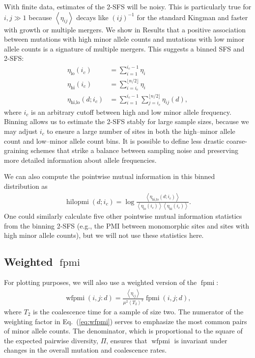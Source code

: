 \documentclass[11pt, letterpaper]{article}   	%
\newcommand{\eq}[1]{Eq.~(\ref{#1})}
\newcommand{\floor}[1]{\lfloor #1 \rfloor}
\newcommand{\E}[1]{\left< #1 \right>}
\DeclareMathOperator{\fpmi}{fpmi}
\DeclareMathOperator{\wfpmi}{wfpmi}
\DeclareMathOperator{\hilopmi}{hilopmi}
\begin{document}
With finite data, estimates of the 2-SFS will be noisy.
This is particularly true for $i,j\gg1$ because $\E{\eta_{ij}}$ decays like $(ij)^{-1}$ for the standard Kingman \autocite{Fu1995} and faster with growth or multiple mergers.
We show in Results that a positive association between mutations with high minor allele counts and mutations with low minor allele counts is a signature of multiple mergers.
This suggests a binned SFS and 2-SFS:
\begin{align}
    \eta_{\text{lo}}(i_c) &= \sum_{i=1}^{i_c-1} \eta_i \\
    \eta_{\text{hi}}(i_c) &= \sum_{i=i_c}^{\floor{n/2}} \eta_i \\
    \eta_{\text{hi,lo}}(d; i_c) &= \sum_{i=1}^{i_c-1} \sum_{j=i_c}^{\floor{n/2}} \eta_{ij}(d),
\end{align}
where $i_c$ is an arbitrary cutoff between high and low minor allele frequency.
Binning allows us to estimate the 2-SFS stably for large sample sizes, because we may adjust $i_c$ to ensure a large number of sites in both the high--minor allele count and low--minor allele count bins.
It is possible to define less drastic coarse-graining schemes that strike a balance between sampling noise and preserving more detailed information about allele frequencies.

We can also compute the pointwise mutual information in this binned distribution as
\begin{align}
    \hilopmi(d; i_c) = \log \frac
                                {\E{\eta_{\text{hi,lo}}(d; i_c)}}
                                {\E{\eta_{\text{lo}}(i_c)}  \E{\eta_{\text{hi}}(i_c)}}.
\end{align}
One could similarly calculate five other pointwise mutual information statistics from the binning 2-SFS (e.g., the PMI between monomorphic sites and sites with high minor allele counts), but we will not use these statistics here.


\subsection*{Weighted $\fpmi$}
For plotting purposes, we will also use a weighted version of the $\fpmi$:
\begin{align}
    \wfpmi(i,j:d) = \frac{\E{\eta_{ij}}}{\mu^2 \E{T_2}^2} \fpmi(i,j;d),
    \label{eq:wfpmi}
\end{align}
where $T_2$ is the coalescence time for a sample of size two.
The numerator of the weighting factor in \eq{eq:wfpmi} serves to emphasize the most common pairs of minor allele counts.
The denominator, which is proportional to the square of the expected pairwise diversity, $\Pi$, ensures that $\wfpmi$ is invariant under changes in the overall mutation and coalescence rates.
\end{document}
